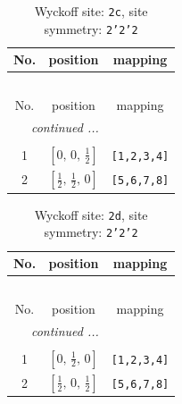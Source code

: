 \documentclass[fleqn,8pt]{jsarticle}
\begin{document}
\renewcommand{\arraystretch}{1.2}
\begin{longtable}{ccc}
\caption{Wyckoff site: {\tt 2c}, site symmetry: {\tt 2'2'2}}
 \\
 \hline \hline
No. & position & mapping \\ \hline \endfirsthead

\multicolumn{2}{l}{\tablename\ \thetable{}} \\
 \hline \hline
No. & position & mapping \\ \hline \endhead

 \hline \hline
\multicolumn{2}{r}{\footnotesize\it continued ...} \\ \endfoot

 \hline \hline
\multicolumn{2}{r}{} \\ \endlastfoot

1 & $\left[ 0,\, 0,\, \frac{1}{2} \right]$ & {\tt [1,2,3,4]} \\ \hline
2 & $\left[ \frac{1}{2},\, \frac{1}{2},\, 0 \right]$ & {\tt [5,6,7,8]} \\
\end{longtable}
\renewcommand{\arraystretch}{1.2}
\begin{longtable}{ccc}
\caption{Wyckoff site: {\tt 2d}, site symmetry: {\tt 2'2'2}}
 \\
 \hline \hline
No. & position & mapping \\ \hline \endfirsthead

\multicolumn{2}{l}{\tablename\ \thetable{}} \\
 \hline \hline
No. & position & mapping \\ \hline \endhead

 \hline \hline
\multicolumn{2}{r}{\footnotesize\it continued ...} \\ \endfoot

 \hline \hline
\multicolumn{2}{r}{} \\ \endlastfoot

1 & $\left[ 0,\, \frac{1}{2},\, 0 \right]$ & {\tt [1,2,3,4]} \\ \hline
2 & $\left[ \frac{1}{2},\, 0,\, \frac{1}{2} \right]$ & {\tt [5,6,7,8]} \\
\end{longtable}
\renewcommand{\arraystretch}{1.2}
\end{document}
